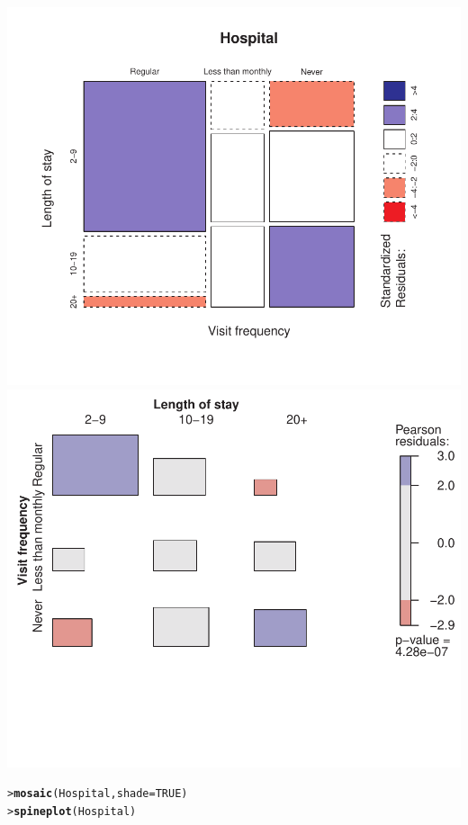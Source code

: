 \documentclass[10pt]{report}\usepackage[]{graphicx}\usepackage[]{color}
\makeatletter
\newcommand{\hlnum}[1]{\textcolor[rgb]{0.686,0.059,0.569}{#1}}%
\newcommand{\hlstd}[1]{\textcolor[rgb]{0.345,0.345,0.345}{#1}}%
\newcommand{\hlkwc}[1]{\textcolor[rgb]{0.333,0.667,0.333}{#1}}%
\newcommand{\hlkwd}[1]{\textcolor[rgb]{0.737,0.353,0.396}{\textbf{#1}}}%
\newenvironment{kframe}{%
 \def\at@end@of@kframe{}%
 \ifinner\ifhmode%
  \def\at@end@of@kframe{\end{minipage}}%
  \begin{minipage}{\columnwidth}%
 \fi\fi%
 \def\FrameCommand##1{\hskip\@totalleftmargin \hskip-\fboxsep
 \colorbox{shadecolor}{##1}\hskip-\fboxsep
     \hskip-\linewidth \hskip-\@totalleftmargin \hskip\columnwidth}%
 \MakeFramed {\advance\hsize-\width
   \@totalleftmargin\z@ \linewidth\hsize
   \@setminipage}}%
 {\par\unskip\endMakeFramed%
 \at@end@of@kframe}
\newenvironment{knitrout}{}{} %
\renewenvironment{knitrout}{\small\renewcommand{\baselinestretch}{.85}}{} %
\makeatother
\begin{document}
\begin{Exercises}
\begin{enumerate*}
\begin{ans}
\begin{knitrout}
\centerline{\includegraphics[width=.5\textwidth]{soln/fig/ex4_5a1-1} 
\includegraphics[width=.5\textwidth]{soln/fig/ex4_5a1-2} }



\end{knitrout}
      \end{ans}
      \begin{ans}
\begin{knitrout}\footnotesize
{}\color{fgcolor}\begin{kframe}
\begin{alltt}
\hlstd{> }\hlkwd{mosaic}\hlstd{(Hospital,} \hlkwc{shade}\hlstd{=}\hlnum{TRUE}\hlstd{)}
\hlstd{> }\hlkwd{spineplot}\hlstd{(Hospital)}
\end{alltt}
\end{kframe}


\end{knitrout}
\end{ans}
\end{enumerate*}
\end{Exercises}
\end{document}
